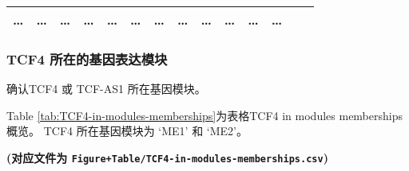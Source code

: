 \documentclass[
]{article}
\begin{document}
\begin{longtable}[]{@{}llllllllllllll@{}}
\begin{minipage}[t]{0.04\columnwidth}
\ldots{}\strut
\end{minipage} & \begin{minipage}[t]{0.04\columnwidth}\raggedright
\ldots{}\strut
\end{minipage} & \begin{minipage}[t]{0.05\columnwidth}\raggedright
\ldots{}\strut
\end{minipage} & \begin{minipage}[t]{0.05\columnwidth}\raggedright
\ldots{}\strut
\end{minipage} & \begin{minipage}[t]{0.03\columnwidth}\raggedright
\ldots{}\strut
\end{minipage} & \begin{minipage}[t]{0.05\columnwidth}\raggedright
\ldots{}\strut
\end{minipage} & \begin{minipage}[t]{0.05\columnwidth}\raggedright
\ldots{}\strut
\end{minipage} & \begin{minipage}[t]{0.05\columnwidth}\raggedright
\ldots{}\strut
\end{minipage} & \begin{minipage}[t]{0.05\columnwidth}\raggedright
\ldots{}\strut
\end{minipage} & \begin{minipage}[t]{0.05\columnwidth}\raggedright
\ldots{}\strut
\end{minipage} & \begin{minipage}[t]{0.05\columnwidth}\raggedright
\ldots{}\strut
\end{minipage} & \begin{minipage}[t]{0.02\columnwidth}\raggedright
\ldots{}\strut
\end{minipage}\tabularnewline
\bottomrule
\end{longtable}

\hypertarget{tcf4-ux6240ux5728ux7684ux57faux56e0ux8868ux8fbeux6a21ux5757}{%
\subsubsection{TCF4 所在的基因表达模块}\label{tcf4-ux6240ux5728ux7684ux57faux56e0ux8868ux8fbeux6a21ux5757}}

确认TCF4 或 TCF-AS1 所在基因模块。

Table \ref{tab:TCF4-in-modules-memberships}为表格TCF4 in modules memberships概览。
TCF4 所在基因模块为 `ME1' 和 `ME2'。

\textbf{(对应文件为 \texttt{Figure+Table/TCF4-in-modules-memberships.csv})}
\end{document}
